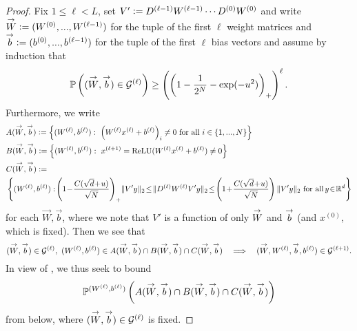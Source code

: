 \begin{proof}
Fix $1 \leq \ell < L$, set $V' \mathrel{\mathop:}=  D^{(\ell-1)} W^{(\ell-1)} \cdots D^{(0)} W^{(0)}$ and write $\overset{\rightarrow}{W} \mathrel{\mathop:}= (W^{(0)}, ..., W^{(\ell - 1)})$ for the tuple of the first $\ell$ weight matrices and $\overset{\rightarrow}{b} \mathrel{\mathop:}= (b^{(0)}, ..., b^{(\ell - 1)})$ for the tuple of the first $\ell$ bias vectors and assume by induction that
\begin{equation} \label{eq: ind_hyp}
\mathbb{P}\left((\overset{\rightarrow}{W}, \overset{\rightarrow}{b}) \in \mathcal{G}^{(\ell)}\right) \geq  \left(\left(1 - \frac{1}{2^N} - \exp(-u^2)\right)_+\right)^\ell.
\end{equation} 
 Furthermore, we write
\begin{align*}
&A(\arrow{W}, \arrow{b}) \defeq \left\{ (W^{(\ell)}, b^{(\ell)}) : \ \left(W^{(\ell)}x^{(\ell)} + b^{(\ell)}\right)_i \neq 0 \text{ for all } i \in \{1,...,N\}\right\} \\
 &B(\arrow{W}, \arrow{b}) \defeq \left\{(W^{(\ell)}, b^{(\ell)}): \ x^{(\ell + 1)} = \relu(W^{(\ell)}x^{(\ell)} + b^{(\ell)}) \neq 0\right\} \\
 & C (\overset{\rightarrow}{W}, \overset{\rightarrow}{b}) \defeq \\
 &\left\{ (W^{(\ell )}, b^{(\ell)}):  \! \left(1\! - \!\frac{C(\sqrt{d}\! + \! u)}{\sqrt{N}}\right)_+ \! \Vert V'y \Vert_2 \!\leq \!\Vert D^{(\ell)}W^{(\ell)}V'y\Vert_2 \!\leq\! \left( 1\!+ \!\frac{C(\sqrt{d} \!+ \!u)}{\sqrt{N}}\right)\Vert V'y \Vert_2 \  \text{for all } \! y \! \in \! \RR^d\right\} 
\end{align*}
for each $\overset{\rightarrow}{W}, \overset{\rightarrow}{b}$, where we note that $V'$ is a function of only $\overset{\rightarrow}{W}$ and $\overset{\rightarrow}{b}$ (and $x^{(0)}$, which is fixed).
Then we see that
\begin{equation*} 
(\overset{\rightarrow}{W}, \overset{\rightarrow}{b}) \in \mathcal{G}^{(\ell)}, \ (W^{(\ell)}, b^{(\ell)}) \in A(\overset{\rightarrow}{W}, \overset{\rightarrow}{b}) \cap B(\overset{\rightarrow}{W}, \overset{\rightarrow}{b}) \cap C(\overset{\rightarrow}{W}, \overset{\rightarrow}{b}) \quad \Longrightarrow \quad (\overset{\rightarrow}{W}, W^{(\ell)}, \overset{\rightarrow}{b}, b^{(\ell)}) \in \mathcal{G}^{(\ell+1)}.
\end{equation*}
In view of , we thus seek to bound 
\begin{equation*}
\mathbb{P}^{(W^{(\ell)}, b^{(\ell)})} \left(A (\overset{\rightarrow}{W}, \overset{\rightarrow}{b}) \cap B(\overset{\rightarrow}{W}, \overset{\rightarrow}{b}) \cap C(\overset{\rightarrow}{W}, \overset{\rightarrow}{b})\right)
\end{equation*}
 from below, where $ (\overset{\rightarrow}{W}, \overset{\rightarrow}{b}) \in \mathcal{G}^{(\ell)}$ is fixed. 
 

\end{proof}
